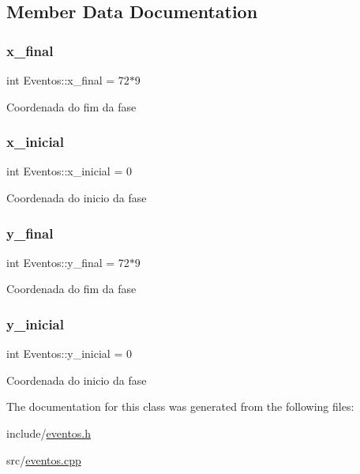 \subsection{Member Data Documentation}
\mbox{\label{classEventos_afdf3e21f837f2a84c5d258383ada6c29}} 
\subsubsection{\texorpdfstring{x\+\_\+final}{x\_final}}
{\footnotesize\ttfamily int Eventos\+::x\+\_\+final = 72$\ast$9\hspace{0.3cm}{\ttfamily [private]}}

Coordenada do fim da fase \mbox{\label{classEventos_aa09d32f02896554a3409d0093114cab1}} 
\subsubsection{\texorpdfstring{x\+\_\+inicial}{x\_inicial}}
{\footnotesize\ttfamily int Eventos\+::x\+\_\+inicial = 0\hspace{0.3cm}{\ttfamily [private]}}

Coordenada do inicio da fase \mbox{\label{classEventos_a52967e28579a67b2fef4ed6d427a042d}} 
\subsubsection{\texorpdfstring{y\+\_\+final}{y\_final}}
{\footnotesize\ttfamily int Eventos\+::y\+\_\+final = 72$\ast$9\hspace{0.3cm}{\ttfamily [private]}}

Coordenada do fim da fase \mbox{\label{classEventos_a42c55facc39e42b7c816a06b3009e228}} 
\subsubsection{\texorpdfstring{y\+\_\+inicial}{y\_inicial}}
{\footnotesize\ttfamily int Eventos\+::y\+\_\+inicial = 0\hspace{0.3cm}{\ttfamily [private]}}

Coordenada do inicio da fase 

The documentation for this class was generated from the following files\+:\begin{DoxyCompactItemize}
\item 
include/\hyperlink{eventos_8h}{eventos.\+h}\item 
src/\hyperlink{eventos_8cpp}{eventos.\+cpp}\end{DoxyCompactItemize}
